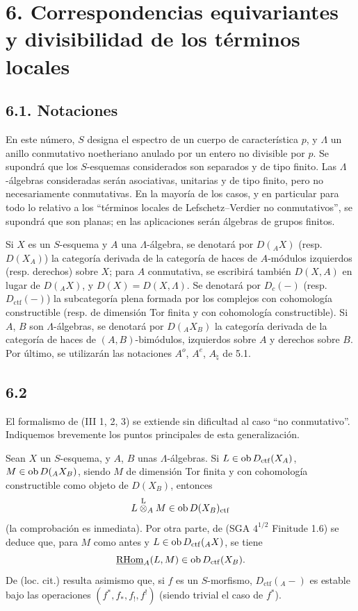 \section*{6. Correspondencias equivariantes y divisibilidad de los términos locales}

\subsection*{6.1. Notaciones}

En este número, $S$ designa el espectro de un cuerpo de característica $p$, y $\Lambda$ un anillo conmutativo noetheriano anulado por un entero no divisible por $p$. Se supondrá que los $S$-esquemas considerados son separados y de tipo finito. Las $\Lambda$-álgebras consideradas serán asociativas, unitarias y de tipo finito, pero no necesariamente conmutativas. En la mayoría de los casos, y en particular para todo lo relativo a los ``términos locales de Lefschetz--Verdier no conmutativos'', se supondrá que son planas; en las aplicaciones serán álgebras de grupos finitos.

Si $X$ es un $S$-esquema y $A$ una $\Lambda$-álgebra, se denotará por $D({}_AX)$ (resp. $D(X_A)$) la categoría derivada de la categoría de haces de $A$-módulos izquierdos (resp. derechos) sobre $X$; para $A$ conmutativa, se escribirá también $D(X,A)$ en lugar de $D({}_AX)$, y $D(X)=D(X,\Lambda)$. Se denotará por $D_c(-)$ (resp. $D_{\mathrm{ctf}}(-)$) la subcategoría plena formada por los complejos con cohomología constructible (resp. de dimensión Tor finita y con cohomología constructible). Si $A$, $B$ son $\Lambda$-álgebras, se denotará por $D({}_AX_B)$ la categoría derivada de la categoría de haces de $(A,B)$-bimódulos, izquierdos sobre $A$ y derechos sobre $B$. Por último, se utilizarán las notaciones $A^o$, $A^e$, $A_{\natural}$ de 5.1.

\subsection*{6.2}
El formalismo de (III 1, 2, 3) se extiende sin dificultad al caso ``no conmutativo''. Indiquemos brevemente los puntos principales de esta generalización.

Sean $X$ un $S$-esquema, y $A$, $B$ unas $\Lambda$-álgebras. Si $L\in\operatorname{ob} D_{\mathrm{ctf}}(X_A)$, $M\in\operatorname{ob} D({}_AX_B)$, siendo $M$ de dimensión Tor finita y con cohomología constructible como objeto de $D(X_B)$, entonces
\[
L\overset{\mathrm L}{\otimes}_A M\in\operatorname{ob} D(X_B)_{\mathrm{ctf}}
\]
(la comprobación es inmediata). Por otra parte, de (SGA $4^{1/2}$ Finitude 1.6) se deduce que, para $M$ como antes y $L\in\operatorname{ob} D_{\mathrm{ctf}}({}_AX)$, se tiene
\[
\underline{\mathrm{RHom}}_A(L,M)\in\operatorname{ob} D_{\mathrm{ctf}}(X_B).
\]
De (loc. cit.) resulta asimismo que, si $f$ es un $S$-morfismo, $D_{\mathrm{ctf}}({}_A-)$ es estable bajo las operaciones $(f^*,f_*,f_!,f^!)$ (siendo trivial el caso de $f^*$).
